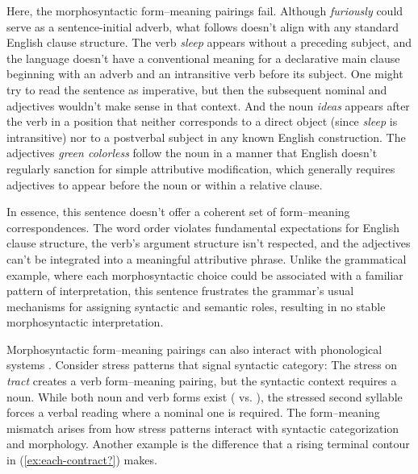 Here, the morphosyntactic form--meaning pairings fail. Although \textit{furiously} could serve as a sentence-initial adverb, what follows doesn't align with any standard English clause structure. The verb \textit{sleep} appears without a preceding subject, and the language doesn't have a conventional meaning for a declarative main clause beginning with an adverb and an intransitive verb before its subject. One might try to read the sentence as imperative, but then the subsequent nominal and adjectives wouldn't make sense in that context. And the noun \textit{ideas} appears after the verb in a position that neither corresponds to a direct object (since \textit{sleep} is intransitive) nor to a postverbal subject in any known English construction. The adjectives \textit{green colorless} follow the noun in a manner that English doesn't regularly sanction for simple attributive modification, which generally requires adjectives to appear before the noun or within a relative clause.

In essence, this sentence doesn't offer a coherent set of form--meaning correspondences. The word order violates fundamental expectations for English clause structure, the verb’s argument structure isn't respected, and the adjectives can't be integrated into a meaningful attributive phrase. Unlike the grammatical example, where each morphosyntactic choice could be associated with a familiar pattern of interpretation, this sentence frustrates the grammar’s usual mechanisms for assigning syntactic and semantic roles, resulting in no stable morphosyntactic interpretation.

\bigskip
Morphosyntactic form--meaning pairings can also interact with phonological systems \autocite{Regev2024}. Consider stress patterns that signal syntactic category:
\z
The stress on \textit{tract} creates a verb form--meaning pairing, but the syntactic context requires a noun. While both noun and verb forms exist ( vs. ), the stressed second syllable forces a verbal reading where a nominal one is required. The form--meaning mismatch arises from how stress patterns interact with syntactic categorization and morphology. Another example is the difference that a rising terminal contour in (\ref{ex:each-contract?}) makes.

\label{ex:each-contract?}
\z

